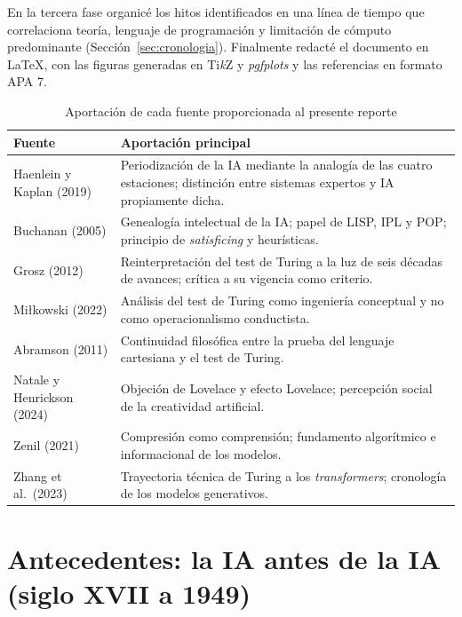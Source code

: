 \documentclass[12pt,letterpaper,oneside]{article}
\begin{document}
En la tercera fase organicé los hitos identificados en una línea de tiempo que correlaciona teoría, lenguaje de programación y limitación de cómputo predominante (Sección~\ref{sec:cronologia}). Finalmente redacté el documento en \LaTeX{}, con las figuras generadas en Ti\textit{k}Z y \textit{pgfplots} y las referencias en formato APA 7.

\begin{table}[H]
\centering
\caption{Aportación de cada fuente proporcionada al presente reporte}
\label{tab:fuentes}
\small
\begin{tabular}{@{}L{4.6cm}L{9.2cm}@{}}
\toprule
\textbf{Fuente} & \textbf{Aportación principal} \\
\midrule
Haenlein y Kaplan (2019) & Periodización de la IA mediante la analogía de las cuatro estaciones; distinción entre sistemas expertos y IA propiamente dicha. \\
Buchanan (2005) & Genealogía intelectual de la IA; papel de LISP, IPL y POP; principio de \textit{satisficing} y heurísticas. \\
Grosz (2012) & Reinterpretación del test de Turing a la luz de seis décadas de avances; crítica a su vigencia como criterio. \\
Miłkowski (2022) & Análisis del test de Turing como ingeniería conceptual y no como operacionalismo conductista. \\
Abramson (2011) & Continuidad filosófica entre la prueba del lenguaje cartesiana y el test de Turing. \\
Natale y Henrickson (2024) & Objeción de Lovelace y efecto Lovelace; percepción social de la creatividad artificial. \\
Zenil (2021) & Compresión como comprensión; fundamento algorítmico e informacional de los modelos. \\
Zhang et al.\ (2023) & Trayectoria técnica de Turing a los \textit{transformers}; cronología de los modelos generativos. \\
\bottomrule
\end{tabular}
\end{table}


\section{Antecedentes: la IA antes de la IA (siglo XVII a 1949)}
\end{document}
